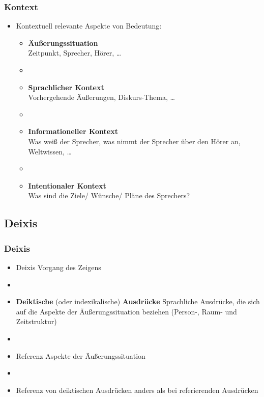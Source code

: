 \begin{frame}
\frametitle{Kontext}

\begin{itemize}
	\item Kontextuell relevante Aspekte von Bedeutung:
	
\vspace{5mm}
	
	\begin{itemize}
		\item \textbf{Äu\ss{}erungssituation} \\
Zeitpunkt, Sprecher, Hörer, \dots
		\item []
		\item \textbf{Sprachlicher Kontext}\\
Vorhergehende Äu\ss{}erungen, Diskurs-Thema, \dots
		\item[]
		\item \textbf{Informationeller Kontext} \\
Was wei\ss{} der Sprecher, was nimmt der Sprecher über den Hörer an, Weltwissen, \dots
		\item []
		\item \textbf{Intentionaler Kontext} \\
Was sind die Ziele/ Wünsche/ Pläne des Sprechers?
	\end{itemize}
	
\end{itemize}

\end{frame}


%
\subsection{Deixis}
%

\begin{frame}
\frametitle{Deixis}

\begin{itemize}
	\item Deixis \ras Vorgang des Zeigens
	\item[]
	\item \textbf{Deiktische} (oder indexikalische) \textbf{Ausdrücke} \ras Sprachliche Ausdrücke, die sich auf die Aspekte der Äu\ss{}erungssituation beziehen (Person-, Raum- und Zeitstruktur)
	\item[]
	\item Referenz \ras Aspekte der Äu\ss{}erungssituation
	\item[]
	\item Referenz von deiktischen Ausdrücken anders als bei referierenden Ausdrücken
\end{itemize}

\end{frame}


